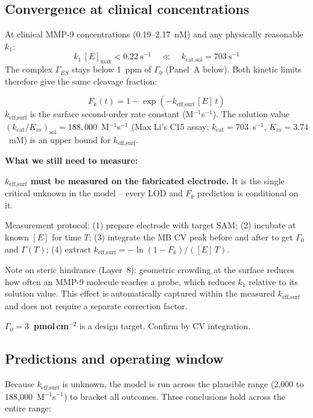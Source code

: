 \documentclass[10pt,a4paper]{article}
\newenvironment{needsbox}{%
  \begin{lrbox}{\tmpbox}\begin{minipage}{0.965\textwidth}\vspace{0.2em}%
  \textbf{\textcolor{ambertext}{What we still need to measure:}}\par\vspace{0.15em}}%
 {\vspace{0.2em}\end{minipage}\end{lrbox}%
  \par\vspace{0.4em}\noindent\colorbox{boxamber}{\usebox{\tmpbox}}\par\vspace{0.4em}}
\newenvironment{eqbox}{%
  \begin{lrbox}{\tmpbox}\begin{minipage}{0.965\textwidth}\vspace{0.2em}}%
 {\vspace{0.2em}\end{minipage}\end{lrbox}%
  \par\vspace{0.3em}\noindent\colorbox{boxgray}{\usebox{\tmpbox}}\par\vspace{0.3em}}
\begin{document}
\subsection{Convergence at clinical concentrations}

At clinical MMP-9 concentrations (0.19--2.17~nM) and any physically reasonable $k_1$:
\[
k_1\,[E]_\text{max} < 0.22~\text{s}^{-1} \quad \ll \quad k_\text{cat,sol} = 703~\text{s}^{-1}
\]
The complex $\Gamma_{ES}$ stays below 1~ppm of $\Gamma_0$ (Panel~A below). Both kinetic
limits therefore give the same cleavage fraction:

\begin{eqbox}
\[
F_k(t) = 1 - \exp\!\left(-k_\text{eff,surf}\,[E]\,t\right)
\]
$k_\text{eff,surf}$ is the surface second-order rate constant (M$^{-1}$s$^{-1}$).
The solution value $(k_\text{cat}/K_m)_\text{sol} = 188{,}000$~M$^{-1}$s$^{-1}$ (Max Li's
C15 assay; $k_\text{cat} = 703$~s$^{-1}$, $K_m = 3.74$~mM) is an upper bound for
$k_\text{eff,surf}$.
\end{eqbox}

\begin{needsbox}
\textbf{$k_\text{eff,surf}$ must be measured on the fabricated electrode.} It is the single
critical unknown in the model -- every LOD and $F_k$ prediction is conditional on it.

Measurement protocol: (1) prepare electrode with target SAM; (2) incubate at known $[E]$
for time $T$; (3) integrate the MB CV peak before and after to get $\Gamma_0$ and $\Gamma(T)$;
(4) extract $k_\text{eff,surf} = -\ln(1-F_k)/([E]\,T)$.

Note on steric hindrance (Layer~8): geometric crowding at the surface reduces how often an
MMP-9 molecule reaches a probe, which reduces $k_1$ relative to its solution value. This
effect is automatically captured within the measured $k_\text{eff,surf}$ and does not
require a separate correction factor.

\textbf{$\Gamma_0 = 3$~pmol\,cm$^{-2}$} is a design target. Confirm by CV integration.
\end{needsbox}

\subsection{Predictions and operating window}

Because $k_\text{eff,surf}$ is unknown, the model is run across the plausible range
(2,000 to 188,000~M$^{-1}$s$^{-1}$) to bracket all outcomes. Three conclusions hold
across the entire range:
\end{document}
